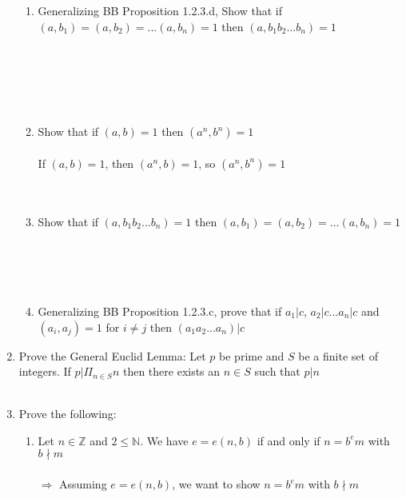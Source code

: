 \documentclass[11pt]{article}
\begin{document}
\begin{enumerate}
\begin{enumerate}
\item Generalizing BB Proposition 1.2.3.d, Show that if $(a,b_1)=(a,b_2)=... (a,b_n)=1$ then $(a,b_1 b_2 ... b_n) = 1$\\
\\
\\
\\
\\
\\
\item Show that if $(a, b) = 1$ then $(a^n, b^n) = 1$\\
\\
If $(a,b) = 1$, then $(a^n,b) = 1$, so $(a^n,b^n) = 1$
\\
\\
\\
\item Show that if $(a, b_1 b_2...b_n) = 1$ then $(a, b_1) = (a, b_2) = ... (a,b_n) = 1$\\
\\\\
\\
\\
\item Generalizing BB Proposition 1.2.3.c, prove that if $a_1 | c$, $a_2| c$...$a_n|c$ and $(a_i, a_j) = 1$ for $i \neq j$ then $(a_1 a_2...a_n)|c$

\end{enumerate}

\newpage %
\item Prove the General Euclid Lemma: Let $p$ be prime and $S$ be a finite set of integers.  If $p|\Pi_{n \in S}n$ then there exists an $n \in S$ such that $p | n$
\\
\\

\newpage %
\item Prove the following:
\begin{enumerate}
\item Let $n \in \mathbb{Z}$ and $2 \leq \mathbb{N}$.  We have $e = e(n,b)$ if and only if $n = b^em$ with $b \nmid m$\\
\\
$\Rightarrow$ Assuming $e = e(n,b)$, we want to show $n = b^em$ with $b \nmid m$\\
\\
\\
\\
\\
\\


\end{enumerate}
\end{enumerate}
\end{document}
